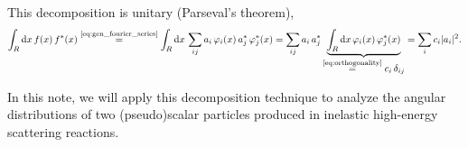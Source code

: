 This decomposition is unitary (Parseval's theorem), \ie
\begin{equation}
  \int_R \dif{x}\, f(x)\, f^*(x)
  \equalUsing{\cref{eq:gen_fourier_series}} \int_R \dif{x}\, \sum_{ij} a_i\, \varphi_i(x)\, a_j^*\, \varphi_j^*(x)
  = \sum_{ij} a_i\, a_j^*\, \dUnderbrace{\int_R \dif{x}\, \varphi_i(x)\, \varphi_j^*(x)}{\equalUsing{\cref{eq:orthogonality}} c_i\, \delta_{ij}}
  = \sum_i c_i \abs{a_i}^2.
\end{equation}

In this note, we will apply this decomposition technique to analyze
the angular distributions of two (pseudo)scalar particles produced in
inelastic high-energy scattering reactions.
